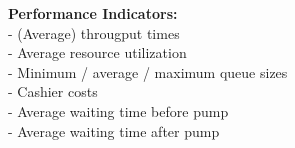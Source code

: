 \textbf{Performance Indicators:}\\
- (Average) througput times\\
- Average resource utilization\\
- Minimum / average / maximum queue sizes\\
- Cashier costs\\
- Average waiting time before pump\\
- Average waiting time after pump
